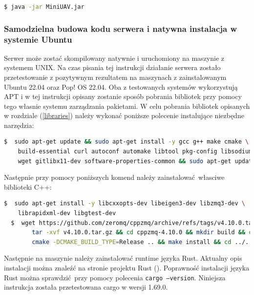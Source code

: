 \documentclass[15pt]{sprawozdanie}
\begin{document}
\begin{lstlisting}[language=bash]
  $ java -jar MiniUAV.jar
\end{lstlisting}

\subsubsection{Samodzielna budowa kodu serwera i natywna instalacja w systemie Ubuntu}

Serwer może zostać skompilowany natywnie i uruchomiony na maszynie z systemem UNIX. Na czas pisania tej instrukcji działanie serwera zostało przetestowanie z pozytywnym rezultatem na maszynach z zainstalowanym Ubuntu 22.04 oraz Pop! OS 22.04. Oba z testowanych systemów wykorzystują APT i w tej instrukcji opisany zostanie sposób pobrania bibliotek przy pomocy tego własnie systemu zarządzania pakietami. W celu pobrania bibliotek opisanych w rozdziale (\ref{libraries}) należy wykonać poniższe polecenie instalujące niezbędne narzędzia:
\begin{lstlisting}[language=bash]
  $  sudo apt-get update && sudo apt-get install -y gcc g++ make cmake \ 
	build-essential curl autoconf automake libtool pkg-config libsodium-dev \
 	wget gitlibx11-dev software-properties-common && sudo apt-get update 
\end{lstlisting}

Następnie przy pomocy poniższych komend należy zainstalować własciwe biblioteki C++:
\begin{lstlisting}[language=bash]
  $  sudo apt-get install -y libcxxopts-dev libeigen3-dev libzmq3-dev \
	librapidxml-dev libgtest-dev 
  $  wget https://github.com/zeromq/cppzmq/archive/refs/tags/v4.10.0.tar.gz && \
    	tar -xvf v4.10.0.tar.gz && cd cppzmq-4.10.0 && mkdir build && cd build && \
    	cmake -DCMAKE_BUILD_TYPE=Release .. && make install && cd ../..
\end{lstlisting}

Następnie na maszynie należy zainstalować runtime języka Rust. Aktualny opis instalacji można znaleźć na stronie projektu Rust (\cite{rust_getting_started}). Poprawność instalacji języka Rust można sprawdzić przy pomocy polecenia \texttt{cargo --version}. Niniejsza instrukcja została przetestowana cargo w wersji 1.69.0.\\
 
\end{document}
